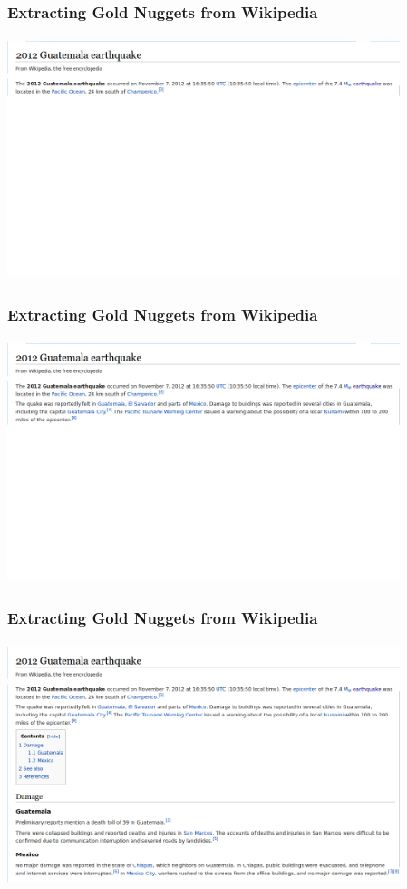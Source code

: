 \documentclass{beamer}
\begin{document}
\begin{frame}
\frametitle{Extracting Gold Nuggets from Wikipedia}
\vspace{5pt}
\includegraphics[width=325pt,height=200pt]{png/wp_evo_1}
\end{frame}
\begin{frame}
\frametitle{Extracting Gold Nuggets from Wikipedia}
\vspace{5pt}
\includegraphics[width=325pt,height=200pt]{png/wp_evo_2}
\end{frame}
\begin{frame}
\frametitle{Extracting Gold Nuggets from Wikipedia}
\vspace{5pt}
\includegraphics[width=325pt,height=200pt]{png/wp_evo_3}
\end{frame}
\end{document}
